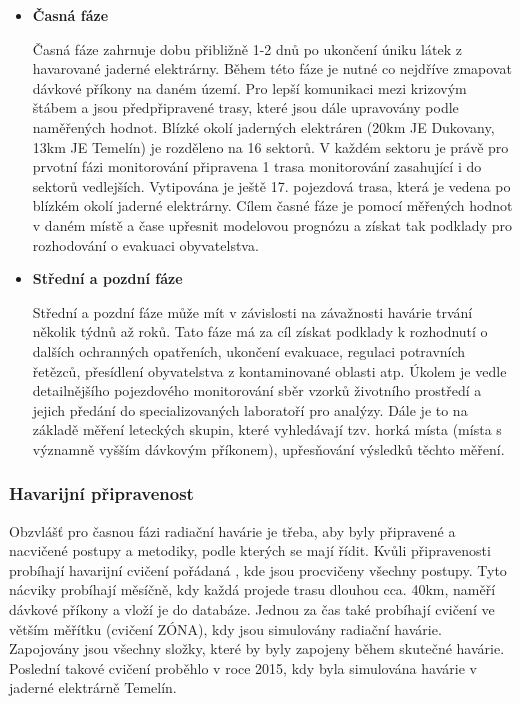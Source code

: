 \begin{itemize}
	\item \textbf{Časná fáze}
	
		Časná fáze zahrnuje dobu přibližně 1-2 dnů po ukončení úniku látek z havarované jaderné elektrárny. Během této fáze je nutné co nejdříve zmapovat dávkové příkony na daném území. Pro lepší komunikaci mezi krizovým štábem a  jsou předpřipravené trasy, které jsou dále upravovány podle naměřených hodnot. Blízké okolí jaderných elektráren (20km JE Dukovany, 13km JE Temelín) je rozděleno na 16 sektorů. V každém sektoru je právě pro prvotní fázi monitorování připravena 1 trasa monitorování zasahující i do sektorů vedlejších. Vytipována je ještě 17. pojezdová trasa, která je vedena po blízkém okolí jaderné elektrárny. Cílem časné fáze je pomocí měřených hodnot v daném místě a čase upřesnit modelovou prognózu a získat tak podklady pro rozhodování o evakuaci obyvatelstva. 

	\item \textbf{Střední a pozdní fáze}
		
		Střední a pozdní fáze může mít v závislosti na závažnosti havárie trvání několik týdnů až roků. Tato fáze má za cíl získat podklady k rozhodnutí o dalších ochranných opatřeních, ukončení evakuace, regulaci potravních řetězců, přesídlení obyvatelstva z kontaminované oblasti atp. Úkolem  je vedle detailnějšího pojezdového monitorování sběr vzorků životního prostředí a jejich předání do specializovaných laboratoří pro analýzy. Dále je to na základě měření leteckých skupin, které vyhledávají tzv. horká místa (místa s významně vyšším dávkovým příkonem), upřesňování výsledků těchto měření. 
\end{itemize}

\subsubsection{Havarijní připravenost}

Obzvlášť pro časnou fázi radiační havárie je třeba, aby byly připravené a nacvičené postupy a metodiky, podle kterých se  mají řídit. Kvůli připravenosti probíhají havarijní cvičení pořádaná , kde jsou procvičeny všechny postupy. Tyto nácviky probíhají měsíčně, kdy každá  projede trasu dlouhou cca. 40km, naměří dávkové příkony a vloží je do databáze. Jednou za čas také probíhají cvičení ve větším měřítku (cvičení ZÓNA), kdy jsou simulovány radiační havárie. Zapojovány jsou všechny složky, které by byly zapojeny během skutečné havárie. Poslední takové cvičení proběhlo v roce 2015, kdy byla simulována havárie v jaderné elektrárně Temelín.


